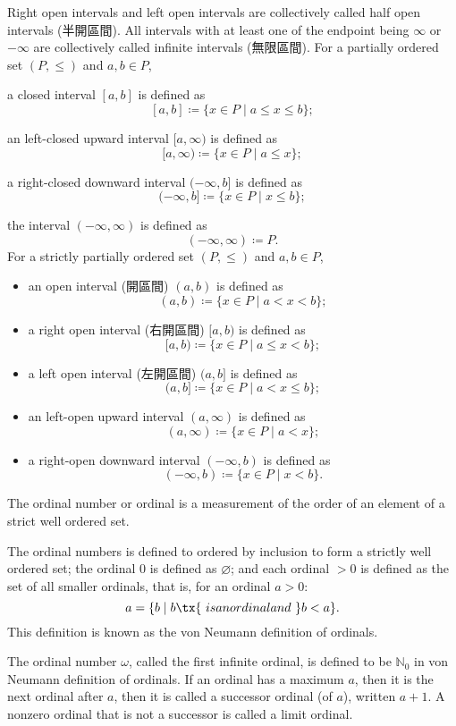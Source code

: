 \documentclass[a4paper,12pt]{article}
\begin{document}
Right open intervals and left open intervals are collectively called half open intervals (半開區間). All intervals with at least one of the endpoint being $\infty$ or $-\infty$ are collectively called infinite intervals (無限區間).
For a partially ordered set $(P,\leq)$ and $a,b\in P$, 
\bit
\item a closed interval $[a,b]$ is defined as
\[[a,b]\coloneq\{x\in P\mid a\leq x\leq b\};\]
\item an left-closed upward interval $[a,\infty)$ is defined as
\[[a,\infty)\coloneq\{x\in P\mid a\leq x\};\]
\item a right-closed downward interval $(-\infty,b]$ is defined as
\[(-\infty,b]\coloneq\{x\in P\mid x\leq b\};\]
\item the interval $(-\infty,\infty)$ is defined as
\[(-\infty,\infty)\coloneq P.\]
\eit
{}
For a strictly partially ordered set $(P,\leq)$ and $a,b\in P$,
\begin{itemize}
\item an open interval (開區間) $(a,b)$ is defined as
\[(a,b)\coloneq\{x\in P\mid a<x<b\};\]
\item a right open interval (右開區間) $[a,b)$ is defined as
\[[a,b)\coloneq\{x\in P\mid a\leq x<b\};\]
\item a left open interval (左開區間) $(a,b]$ is defined as
\[(a,b]\coloneq\{x\in P\mid a<x\leq b\};\]
\item an left-open upward interval $(a,\infty)$ is defined as
\[(a,\infty)\coloneq\{x\in P\mid a<x\};\]
\item a right-open downward interval $(-\infty,b)$ is defined as
\[(-\infty,b)\coloneq\{x\in P\mid x<b\}.\]
\end{itemize}
The ordinal number or ordinal is a measurement of the order of an element of a strict well ordered set.

The ordinal numbers is defined to ordered by inclusion to form a strictly well ordered set; the ordinal $0$ is defined as $\varnothing$; and each ordinal $>0$ is defined as the set of all smaller ordinals, that is, for an ordinal $a>0$:
\[a=\{b\mid b\tx{\ is an ordinal and\ }b<a\}.\]
This definition is known as the von Neumann definition of ordinals.

The ordinal number $\omega$, called the first infinite ordinal, is defined to be $\mathbb{N}_0$ in von Neumann definition of ordinals.
If an ordinal has a maximum $a$, then it is the next ordinal after $a$, then it is called a successor ordinal (of $a$), written $a+1$.
A nonzero ordinal that is not a successor is called a limit ordinal.
\end{document}
